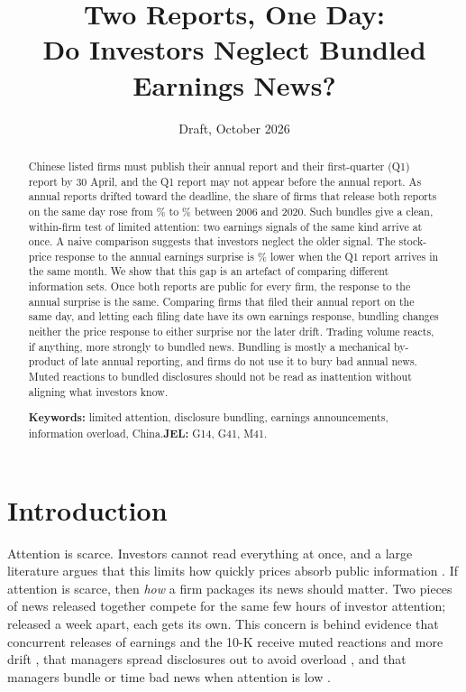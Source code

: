 \documentclass[11pt]{article}
\title{\textbf{Two Reports, One Day:\\ Do Investors Neglect Bundled Earnings News?}}
\author{}
\date{Draft, October 2026}
\begin{document}
\maketitle
\vspace{-2em}
\begin{abstract}
\noindent Chinese listed firms must publish their annual report and their first-quarter (Q1) report by 30 April, and
the Q1 report may not appear before the annual report. As annual reports drifted toward the deadline, the share of
firms that release both reports on the same day rose from \ShareSDearly\% to \ShareSDlate\% between 2006 and 2020.
Such bundles give a clean, within-firm test of limited attention: two earnings signals of the same kind arrive at
once. A naive comparison suggests that investors neglect the older signal. The stock-price response to the annual
earnings surprise is \NaiveDropPct\% lower when the Q1 report arrives in the same month. We show that this gap is an
artefact of comparing different information sets. Once both reports are public for every firm, the response to the
annual surprise is the same. Comparing firms that filed their annual report on the same day, and letting each filing
date have its own earnings response, bundling changes neither the price response to either surprise nor the later
drift. Trading volume reacts, if anything, more strongly to bundled news. Bundling is mostly a mechanical by-product
of late annual reporting, and firms do not use it to bury bad annual news. Muted reactions to bundled disclosures
should not be read as inattention without aligning what investors know.

\medskip\noindent\textbf{Keywords:} limited attention, disclosure bundling, earnings announcements, information
overload, China.\quad \textbf{JEL:} G14, G41, M41.
\end{abstract}

\section{Introduction}

Attention is scarce. Investors cannot read everything at once, and a large literature argues that this limits how
quickly prices absorb public information \citep{kahneman1973,sims2003,hirshleifer2003,peng2006,blankespoor2020}. If
attention is scarce, then \emph{how} a firm packages its news should matter. Two pieces of news released together
compete for the same few hours of investor attention; released a week apart, each gets its own. This concern is
behind evidence that concurrent releases of earnings and the 10-K receive muted reactions and more drift
\citep{arif2019}, that managers spread disclosures out to avoid overload \citep{chapman2019}, and that managers bundle
or time bad news when attention is low \citep{dehaan2015,segal2016,michaely2016}.
\end{document}

